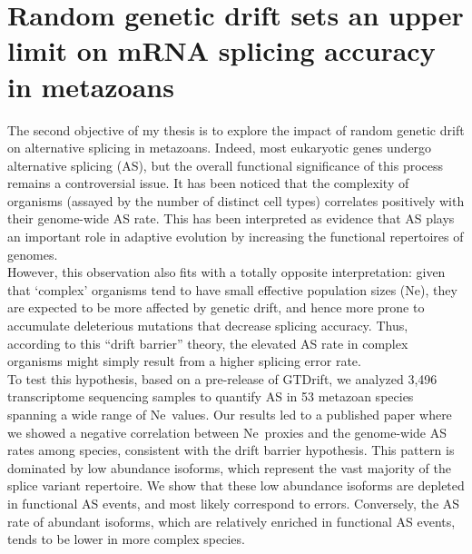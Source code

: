
    \thispagestyle{empty}
    
    \chapter[Random genetic drift sets an upper limit on mRNA splicing accuracy in metazoans]{Random genetic drift sets an upper limit on mRNA splicing accuracy in metazoans}
    \label{chap:AlternativeSplicing}

    \vspace*{30pt}

    The second objective of my thesis is to explore the impact of random genetic drift on alternative splicing in metazoans. Indeed, most eukaryotic genes undergo alternative splicing (AS), but the overall functional significance of this process remains a controversial issue. It has been noticed that the complexity of organisms (assayed by the number of distinct cell types) correlates positively with their genome-wide AS rate. This has been interpreted as evidence that AS plays an important role in adaptive evolution by increasing the functional repertoires of genomes. \\
    
    However, this observation also fits with a totally opposite interpretation: given that ‘complex’ organisms tend to have small effective population sizes (\acrshort{Ne}), they are expected to be more affected by genetic drift, and hence more prone to accumulate deleterious mutations that decrease splicing accuracy. Thus, according to this “drift barrier” theory, the elevated AS rate in complex organisms might simply result from a higher splicing error rate.  \\
    
    To test this hypothesis, based on a pre-release of GTDrift, we analyzed 3,496 transcriptome sequencing samples to quantify \acrshort{AS} in 53 metazoan species spanning a wide range of \acrshort{Ne}~values. Our results led to a published paper where we showed a negative correlation between \acrshort{Ne}~proxies and the genome-wide \acrshort{AS} rates among species, consistent with the drift barrier hypothesis. This pattern is dominated by low abundance isoforms, which represent the vast majority of the splice variant repertoire. We show that these low abundance isoforms are depleted in functional \acrshort{AS} events, and most likely correspond to errors. Conversely, the \acrshort{AS} rate of abundant isoforms, which are relatively enriched in functional \acrshort{AS} events, tends to be lower in more complex species. \\
    
